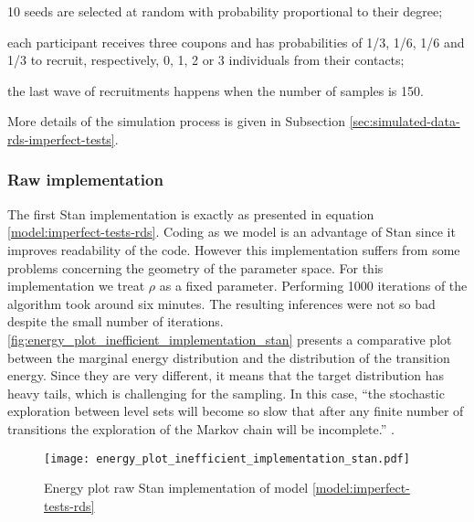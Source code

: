 \begin{alineas}
  \item 10 seeds are selected at random with probability proportional to their
  degree;
  \item each participant receives three coupons and has probabilities of 1/3,
  1/6, 1/6 and 1/3 to recruit, respectively, 0, 1, 2 or 3 individuals from their
  contacts;
  \item the last wave of recruitments happens when the number of samples
  is 150.
\end{alineas}

More details of the simulation process is given in Subsection
\ref{sec:simulated-data-rds-imperfect-tests}.

\subsubsection*{Raw implementation}

The first Stan implementation is exactly as presented in equation
\eqref{model:imperfect-tests-rds}. Coding as we model is an advantage of Stan
since it improves readability of the code. However this implementation suffers from
some problems concerning the geometry of the parameter space. For this
implementation we treat $\rho$ as a fixed parameter. Performing 1000 iterations of the
algorithm took around six minutes. The resulting inferences were not so bad despite
the small number of iterations.
\autoref{fig:energy_plot_inefficient_implementation_stan} presents a
comparative plot between the marginal energy distribution and the distribution
of the transition energy. Since they are very different, it means that the
target distribution has heavy tails, which is challenging for the sampling. In
this case, ``the stochastic exploration between level sets will become so slow that after any finite
number of transitions the exploration of the Markov chain will be
incomplete.'' \cite[p. 44]{betancourt2017conceptual}.

\begin{figure}[htb]
  \centering
  \caption{\label{fig:energy_plot_inefficient_implementation_stan}Energy plot
    raw Stan implementation of model \eqref{model:imperfect-tests-rds}}
  \texttt{[image: energy\_plot\_inefficient\_implementation\_stan.pdf]}
\end{figure}

